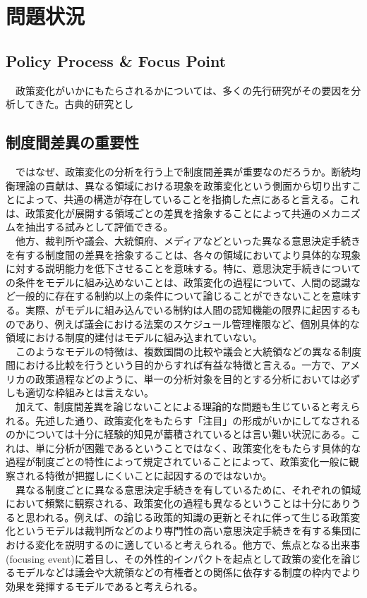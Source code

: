 \section{問題状況}
\subsection{Policy Process \& Focus Point}
　政策変化がいかにもたらされるかについては、多くの先行研究がその要因を分析してきた。古典的研究とし

\subsection{制度間差異の重要性}
　ではなぜ、政策変化の分析を行う上で制度間差異が重要なのだろうか。断続均衡理論の貢献は、異なる領域における現象を政策変化という側面から切り出すことによって、共通の構造が存在していることを指摘した点にあると言える。これは、政策変化が展開する領域ごとの差異を捨象することによって共通のメカニズムを抽出する試みとして評価できる。\\
　他方、裁判所や議会、大統領府、メディアなどといった異なる意思決定手続きを有する制度間の差異を捨象することは、各々の領域においてより具体的な現象に対する説明能力を低下させることを意味する。特に、意思決定手続きについての条件をモデルに組み込めないことは、政策変化の過程について、人間の認識など一般的に存在する制約以上の条件について論じることができないことを意味する。実際、\citep*{Baumgartner2010-rl}がモデルに組み込んでいる制約は人間の認知機能の限界に起因するものであり、例えば議会における法案のスケジュール管理権限など、個別具体的な領域における制度的建付はモデルに組み込まれていない。\\
　このようなモデルの特徴は、複数国間の比較や議会と大統領などの異なる制度間における比較を行うという目的からすれば有益な特徴と言える。一方で、アメリカの政策過程などのように、単一の分析対象を目的とする分析においては必ずしも適切な枠組みとは言えない。\\
　加えて、制度間差異を論じないことによる理論的な問題も生じていると考えられる。先述した通り、政策変化をもたらす「注目」の形成がいかにしてなされるのかについては十分に経験的知見が蓄積されているとは言い難い状況にある。これは、単に分析が困難であるということではなく、政策変化をもたらす具体的な過程が制度ごとの特性によって規定されていることによって、政策変化一般に観察される特徴が把握しにくいことに起因するのではないか。\\
　異なる制度ごとに異なる意思決定手続きを有しているために、それぞれの領域において頻繁に観察される、政策変化の過程も異なるということは十分にありうると思われる。例えば、\citet*{Baumgartner1993-bc, Baumgartner2010-rl}の論じる政策的知識の更新とそれに伴って生じる政策変化というモデルは裁判所などのより専門性の高い意思決定手続きを有する集団における変化を説明するのに適していると考えられる。他方で、焦点となる出来事(focusing event)に着目し、その外性的インパクトを起点として政策の変化を論じるモデル\citep*{Birkland1997-lq, Birkland1998-xp,Sabatier1993-id,Bertelli2013-zq}などは議会や大統領などの有権者との関係に依存する制度の枠内でより効果を発揮するモデルであると考えられる。\\
